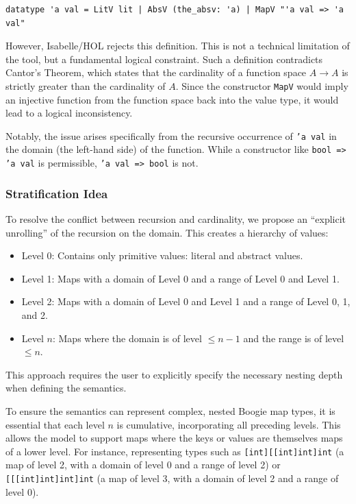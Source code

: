 \documentclass[11pt]{article}
\begin{document}
\begin{verbatim}
datatype 'a val = LitV lit | AbsV (the_absv: 'a) | MapV "'a val => 'a val"
\end{verbatim}

However, Isabelle/HOL rejects this definition.
This is not a technical limitation of the tool, but a fundamental logical constraint.
Such a definition contradicts Cantor's Theorem,
which states that the cardinality of a function space $A \to A$ is strictly greater than the cardinality of $A$.
Since the constructor \texttt{MapV} would imply an injective function from the function space back into the value type,
it would lead to a logical inconsistency.

Notably, the issue arises specifically from the recursive occurrence of \texttt{'a val} in the domain (the left-hand side) of the function.
While a constructor like \texttt{bool => 'a val} is permissible, \texttt{'a val => bool} is not.

\subsubsection{Stratification Idea}
\label{sec:stratification-solution}
To resolve the conflict between recursion and cardinality, we propose an ``explicit unrolling'' of the recursion on the domain.
This creates a hierarchy of values:

\begin{itemize}[leftmargin=1.5em]
  \item Level 0: Contains only primitive values: literal and abstract values.
  \item Level 1: Maps with a domain of Level 0 and a range of Level 0 and Level 1.
  \item Level 2: Maps with a domain of Level 0 and Level 1 and a range of Level 0, 1, and 2.
  \item Level $n$: Maps where the domain is of level $\le n-1$ and the range is of level $\le n$.
\end{itemize}


This approach requires the user to explicitly specify the necessary nesting depth when defining the semantics.

To ensure the semantics can represent complex, nested Boogie map types,
it is essential that each level $n$ is cumulative, incorporating all preceding levels.
This allows the model to support maps where the keys or values are themselves maps of a lower level.
For instance, representing types such as
\texttt{[int][[int]int]int} (a map of level 2, with a domain of level 0 and a range of level 2) or \texttt{[[[int]int]int]int} (a map of level 3, with a domain of level 2 and a range of level 0).
\end{document}
